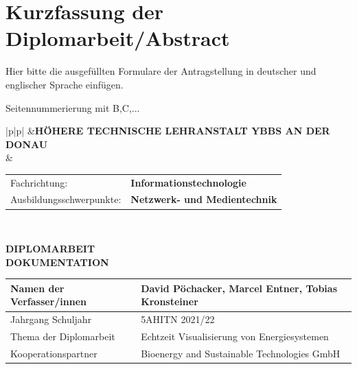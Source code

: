 \chapter*{Kurzfassung der Diplomarbeit/Abstract} 

Hier bitte die ausgefüllten Formulare der Antragstellung in deutscher und englischer Sprache einfügen.

Seitennummerierung mit B,C,...

\clearpage

\newlength{\htllogobreite}
\newlength{\beschriftungsbreite}
\newlength{\feldA}
\newlength{\feldB}

\begin{tabular}{|p{\htllogobreite}|p{\beschriftungsbreite}|}
\hline
{}&{\vspace{0.05em}\textbf{HÖHERE TECHNISCHE LEHRANSTALT YBBS AN DER DONAU}}\\[1.05em]
 & { \begin{tabular}{p{\feldA} p{\feldB}}
    Fachrichtung:&\textbf{Informationstechnologie}\\
    Ausbildungsschwerpunkte:&\textbf{Netzwerk- und Medientechnik}\\
   \end{tabular}
   }\\
\hline
\end{tabular}

\begin{center}
 \LARGE \textbf{DIPLOMARBEIT}\\
 \Large \textbf{DOKUMENTATION}\\
 \normalsize
\end{center}

\newlength{\feldC}
\newlength{\feldD}

\linespread{1.1} \normalsize
\begin{tabular}{|p{\feldC}|p{\feldD}|}
 \hline
 Namen der Verfasser/innen & David Pöchacker, Marcel Entner, Tobias Kronsteiner \\
 \hline
 Jahrgang Schuljahr & 5AHITN  2021/22 \\
 \hline
 Thema der Diplomarbeit &Echtzeit Visualisierung von Energiesystemen \\
 \hline
 Kooperationspartner & Bioenergy and Sustainable Technologies GmbH\\
 \hline
\end{tabular}

